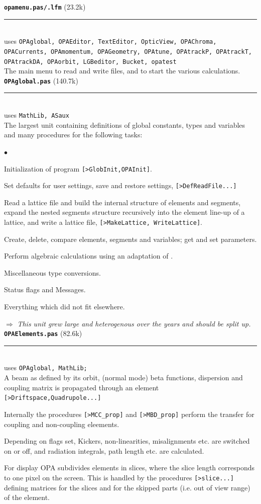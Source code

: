 \documentclass[12pt]{article}
\newenvironment{mylist}
  {\begin{list}{$\bullet$}{\parsep 0pt}}
  {\end{list}}
\newcommand\todo[1]{$\Longrightarrow$ {\em #1} }
\newcommand\code[1]{{\tt [#1]}}
\newcommand\opamodule[3]{{\bf \tt #1} #2\\  \rule[3pt]{\textwidth}{0.2pt} \\ {\scriptsize uses \tt  #3}\\[1ex]}
\begin{document}
\opamodule{opamenu.pas/.lfm}{(23.2k)}
{OPAglobal, OPAEditor, TextEditor, OpticView, OPAChroma, OPACurrents, OPAmomentum, OPAGeometry, OPAtune, OPAtrackP, OPAtrackT, OPAtrackDA, OPAorbit, LGBeditor, Bucket, opatest}
The main menu to read and write files, and to start the various calculations.\\

\opamodule{OPAglobal.pas}{(140.7k)}{MathLib, ASaux}
The largest unit containing definitions of global constants, types and variables and many procedures for the following tasks:
\begin{mylist}
\item Initialization of program \code{>GlobInit,OPAInit}.
\item Set defaults for user settings, save and restore settings, \code{>DefReadFile...}
\item Read a lattice file and build the internal structure of elements and segments, expand the nested segments structure recursively into the element line-up of a lattice, and write a lattice file, \code{>MakeLattice, WriteLattice}.
\item Create, delete, compare elements, segments and variables; get and set parameters.
\item Perform algebraic calculations using an adaptation of \cite{rosetta}.
\item Miscellaneous type conversions.
\item Status flags and Messages.
\item Everything which did not fit elsewhere.
\end{mylist}
\todo{This unit grew large and heterogenous over the years and should be split up.}\\

\opamodule{OPAElements.pas}{(82.6k)}{OPAglobal, MathLib;}
A beam as defined by its orbit, (normal mode) beta functions, dispersion and coupling matrix is propagated through an element \code{>Driftspace,Quadrupole...}

Internally the procedures \code{>MCC\_prop} and \code{>MBD\_prop} perform the transfer for coupling and non-coupling eleements.

Depending on flags set, Kickers, non-linearities, misalignments etc. are switched on or off,  and radiation integrals, path length etc. are calculated.

For display OPA subdivides elements in slices, where the slice length corresponds to one pixel on the screen. This is handled by the procedures \code{>slice...} defining matrices for the slices and for the skipped parts (i.e. out of view range) of the element.
\end{document}
